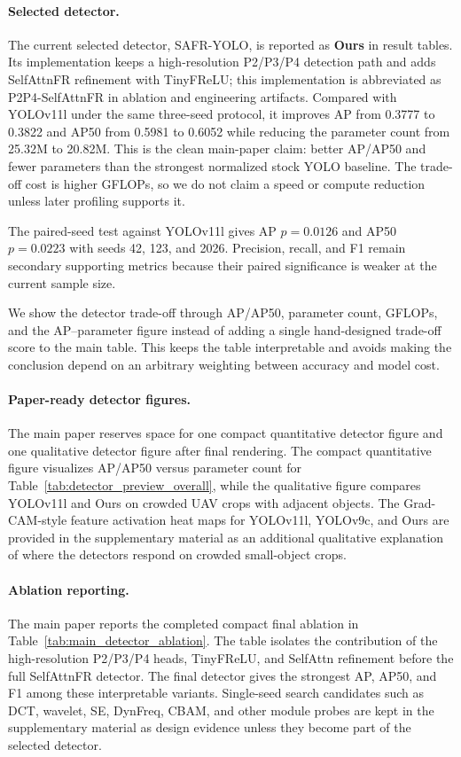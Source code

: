 \paragraph{Selected detector.}
The current selected detector, SAFR-YOLO, is reported as \textbf{Ours} in
result tables. Its implementation keeps a high-resolution P2/P3/P4 detection
path and adds SelfAttnFR refinement with TinyFReLU; this implementation is
abbreviated as P2P4-SelfAttnFR in ablation and engineering artifacts. Compared
with YOLOv11l under the same three-seed protocol, it
improves AP from 0.3777 to 0.3822 and AP50 from 0.5981 to 0.6052 while reducing
the parameter count from 25.32M to 20.82M. This is the clean main-paper claim:
better AP/AP50 and fewer parameters than the strongest normalized stock YOLO
baseline. The trade-off cost is higher GFLOPs, so we do not claim a
speed or compute reduction unless later profiling supports it.

The paired-seed test against YOLOv11l gives AP $p=0.0126$ and AP50 $p=0.0223$
with seeds 42, 123, and 2026. Precision, recall, and F1 remain secondary
supporting metrics because their paired significance is weaker at the current
sample size.

We show the detector trade-off through AP/AP50, parameter count, GFLOPs, and
the AP--parameter figure instead of adding a single hand-designed trade-off
score to the main table. This keeps the table interpretable and avoids making
the conclusion depend on an arbitrary weighting between accuracy and model
cost.

\paragraph{Paper-ready detector figures.}
The main paper reserves space for one compact quantitative detector figure and
one qualitative detector figure after final rendering. The compact quantitative
figure visualizes AP/AP50 versus parameter count for
Table~\ref{tab:detector_preview_overall}, while the qualitative figure compares
YOLOv11l and Ours on crowded UAV crops with adjacent objects. The
Grad-CAM-style feature activation heat maps for YOLOv11l, YOLOv9c, and
Ours are provided in the supplementary material as an additional qualitative
explanation of where the detectors respond on crowded small-object crops.

\paragraph{Ablation reporting.}
The main paper reports the completed compact final ablation in
Table~\ref{tab:main_detector_ablation}. The table isolates the contribution of
the high-resolution P2/P3/P4 heads, TinyFReLU, and SelfAttn refinement before
the full SelfAttnFR detector. The final detector gives the strongest AP, AP50,
and F1 among these interpretable variants. Single-seed search candidates such as
DCT, wavelet, SE, DynFreq, CBAM, and other module probes are kept in the
supplementary material as design evidence unless they become part of the
selected detector.


